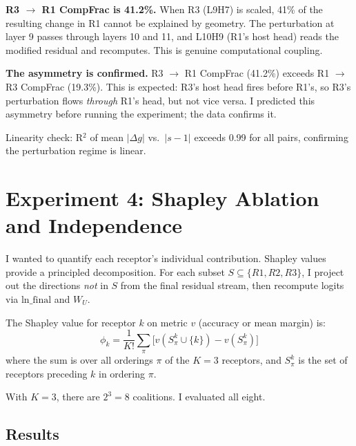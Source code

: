 \documentclass[11pt,a4paper]{article}
\begin{document}
\textbf{R3 $\to$ R1 CompFrac is 41.2\%.} When R3 (L9H7) is scaled, 41\% of the resulting change in R1 cannot be explained by geometry. The perturbation at layer 9 passes through layers 10 and 11, and L10H9 (R1's host head) reads the modified residual and recomputes. This is genuine computational coupling.

\textbf{The asymmetry is confirmed.} R3 $\to$ R1 CompFrac (41.2\%) exceeds R1 $\to$ R3 CompFrac (19.3\%). This is expected: R3's host head fires before R1's, so R3's perturbation flows \emph{through} R1's head, but not vice versa. I predicted this asymmetry before running the experiment; the data confirms it.

Linearity check: R$^2$ of mean $|\Delta g|$ vs.\ $|s-1|$ exceeds 0.99 for all pairs, confirming the perturbation regime is linear.


\section{Experiment 4: Shapley Ablation and Independence}
\label{sec:exp4}

I wanted to quantify each receptor's individual contribution. Shapley values provide a principled decomposition. For each subset $S \subseteq \{R1, R2, R3\}$, I project out the directions \emph{not} in $S$ from the final residual stream, then recompute logits via $\text{ln\_final}$ and $W_U$.

The Shapley value for receptor $k$ on metric $v$ (accuracy or mean margin) is:
\begin{equation}
\phi_k = \frac{1}{K!} \sum_{\pi} \big[v(S_\pi^k \cup \{k\}) - v(S_\pi^k)\big]
\end{equation}
where the sum is over all orderings $\pi$ of the $K=3$ receptors, and $S_\pi^k$ is the set of receptors preceding $k$ in ordering $\pi$.

With $K=3$, there are $2^3 = 8$ coalitions. I evaluated all eight.

\subsection{Results}
\end{document}

